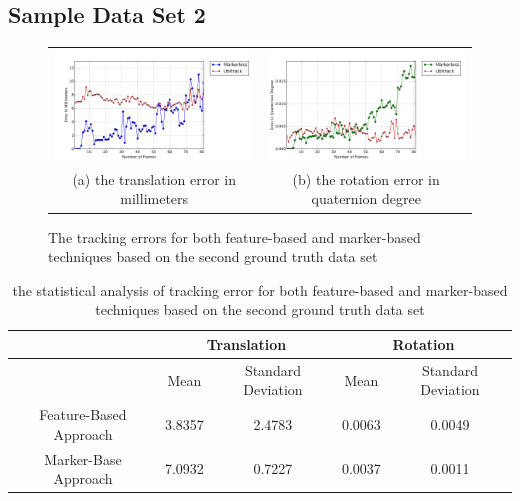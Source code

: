 \subsection{Sample Data Set 2}
\begin{figure}[H]
\begin{tabular}{cc}
  \includegraphics[width=80mm]{figures/frame_400/graph_translation} &  \includegraphics[width=80mm]{figures/frame_400/graph_rotation} \\
(a) the translation error in millimeters & (b) the rotation error in quaternion degree \\[6pt]
\end{tabular}
\caption{The tracking errors for both feature-based and marker-based techniques based on the second ground truth data set}\label{fig:sample_02}
\end{figure}

\begin{table}[H]
\centering
  \begin{tabular}{| c || c | c | c | c |}
      \hline
      & \multicolumn{2}{c|}{Translation} & \multicolumn{2}{c|}{Rotation} \\ \hline
       & Mean & Standard Deviation & Mean & Standard Deviation \\ \hline
      Feature-Based Approach & 3.8357 & 2.4783 & 0.0063 & 0.0049 \\ \hline
      Marker-Base Approach & 7.0932 & 0.7227 & 0.0037 & 0.0011 \\ \hline
  \end{tabular}
  \caption{the statistical analysis of tracking error for both feature-based and marker-based techniques based on the second ground truth data set} \label{tab:sample_02}
\end{table}

